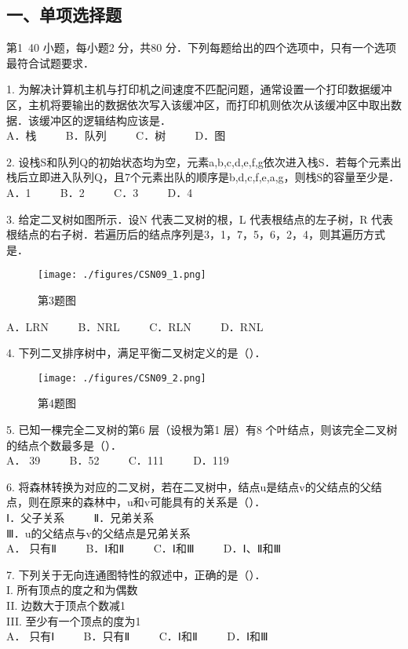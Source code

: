 
\subsection{一、单项选择题}
第1~40 小题，每小题2 分，共80 分．下列每题给出的四个选项中，只有一个选项最符合试题要求．

1. 为解决计算机主机与打印机之间速度不匹配问题，通常设置一个打印数据缓冲区，主机将要输出的数据依次写入该缓冲区，而打印机则依次从该缓冲区中取出数据．该缓冲区的逻辑结构应该是． \\
A．栈 $\qquad$ B．队列 $\qquad$ C．树 $\qquad$ D．图

2. 设栈S和队列Q的初始状态均为空，元素a,b,c,d,e,f,g依次进入栈S．若每个元素出栈后立即进入队列Q，且7个元素出队的顺序是b,d,c,f,e,a,g，则栈S的容量至少是． \\
A．1 $\qquad$ B．2 $\qquad$ C．3 $\qquad$ D．4

3. 给定二叉树如图所示．设N 代表二叉树的根，L 代表根结点的左子树，R 代表根结点的右子树．若遍历后的结点序列是3，1，7，5，6，2，4，则其遍历方式是． \\
\begin{figure}[ht]
\centering
\texttt{[image: ./figures/CSN09\_1.png]}
\caption{第3题图} \label{CSN09_fig1}
\end{figure}
A．LRN $\qquad$ B．NRL $\qquad$ C．RLN $\qquad$ D．RNL

4. 下列二叉排序树中，满足平衡二叉树定义的是（）．\\
\begin{figure}[ht]
\centering
\texttt{[image: ./figures/CSN09\_2.png]}
\caption{第4题图} \label{CSN09_fig2}
\end{figure}

5. 已知一棵完全二叉树的第6 层（设根为第1 层）有8 个叶结点，则该完全二叉树的结点个数最多是（）． \\
A． 39 $\qquad$ B．52 $\qquad$ C．111 $\qquad$ D．119

6. 将森林转换为对应的二叉树，若在二叉树中，结点u是结点v的父结点的父结点，则在原来的森林中，u和v可能具有的关系是（）． \\
Ⅰ．父子关系 $\qquad$ Ⅱ．兄弟关系 \\
Ⅲ．u的父结点与v的父结点是兄弟关系 \\
A． 只有Ⅱ $\qquad$ B．Ⅰ和Ⅱ $\qquad$ C．Ⅰ和Ⅲ $\qquad$ D．Ⅰ、Ⅱ和Ⅲ

7. 下列关于无向连通图特性的叙述中，正确的是（）． \\
I. 所有顶点的度之和为偶数 \\
II. 边数大于顶点个数减1 \\
III. 至少有一个顶点的度为1 \\
A． 只有Ⅰ $\qquad$ B．只有Ⅱ $\qquad$ C．Ⅰ和Ⅱ $\qquad$ D．Ⅰ和Ⅲ

